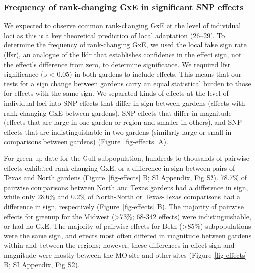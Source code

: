 \documentclass[
  9pt,
  twocolumn,
  twoside]{pnas-new}
\begin{document}
\subsubsection{Frequency of rank-changing GxE in significant SNP
effects}\label{frequency-of-rank-changing-gxe-in-significant-snp-effects}

We expected to observe common rank-changing GxE at the level of
individual loci as this is a key theoretical prediction of local
adaptation (26--29). To determine the frequency of rank-changing GxE, we
used the local false sign rate (lfsr), an analogue of the lfdr that
establishes confidence in the effect sign, not the effect's difference
from zero, to determine significance. We required lfsr significance (p
\textless{} 0.05) in both gardens to include effects. This means that
our tests for a sign change between gardens carry an equal statistical
burden to those for effects with the same sign. We separated kinds of
effects at the level of individual loci into SNP effects that differ in
sign between gardens (effects with rank-changing GxE between gardens),
SNP effects that differ in magnitude (effects that are large in one
garden or region and smaller in others), and SNP effects that are
indistinguishable in two gardens (similarly large or small in
comparisons between gardens) (Figure~\ref{fig-effects} A).

For green-up date for the Gulf subpopulation, hundreds to thousands of
pairwise effects exhibited rank-changing GxE, or a difference in sign
between pairs of Texas and North gardens (Figure~\ref{fig-effects} B; SI
Appendix, Fig S2). 78.7\% of pairwise comparisons between North and
Texas gardens had a difference in sign, while only 28.6\% and 0.2\% of
North-North or Texas-Texas comparisons had a difference in sign,
respectively (Figure~\ref{fig-effects} B). The majority of pairwise
effects for greenup for the Midwest (\textgreater73\%; 68-342 effects)
were indistinguishable, or had no GxE. The majority of pairwise effects
for Both (\textgreater85\%) subpopulations were the same sign, and
effects most often differed in magnitude between gardens within and
between the regions; however, these differences in effect sign and
magnitude were mostly between the MO site and other sites
(Figure~\ref{fig-effects} B; SI Appendix, Fig S2).
\end{document}
